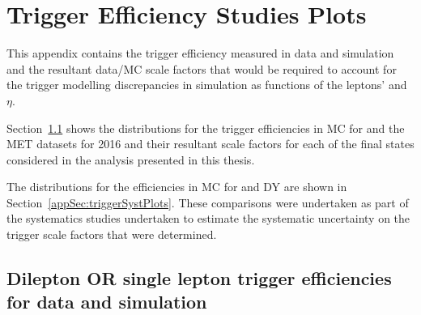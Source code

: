 \chapter{Trigger Efficiency Studies Plots}\label{app:triggerEff}
This appendix contains the trigger efficiency measured in data and simulation and the resultant data/MC scale factors that would be required to account for the trigger modelling discrepancies in simulation as functions of the leptons' \pT and $\eta$.

Section~\ref{appSec:triggerEffPlots} shows the distributions for the trigger efficiencies in MC for \ttbar and the MET datasets for 2016 and their resultant scale factors for each of the final states considered in the analysis presented in this thesis.

The distributions for the efficiencies in MC for \ttbar and DY are shown in Section~\ref{appSec:triggerSystPlots}. 
These comparisons were undertaken as part of the systematics studies undertaken to estimate the systematic uncertainty on the trigger scale factors that were determined.

\clearpage
\newpage

\section{Dilepton OR single lepton trigger efficiencies for data and \ttbar simulation}\label{appSec:triggerEffPlots}

